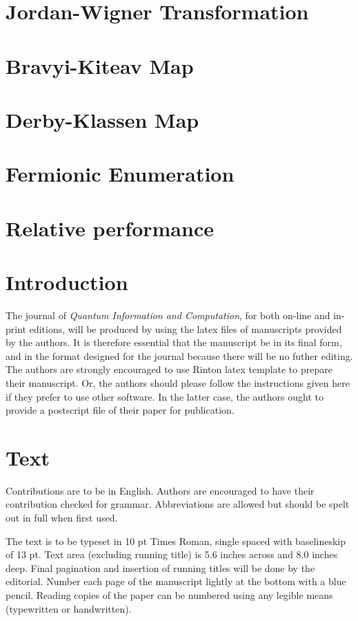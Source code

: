 \documentclass[twoside]{article}
\renewcommand{\thefootnote}{\fnsymbol{footnote}}  %
\begin{document}
\section{Jordan-Wigner Transformation}\label{jordan-wigner_section}
\section{Bravyi-Kiteav Map}\label{bravyi-kitaev_section}
\section{Derby-Klassen Map}\label{derby-klassen_section}
\section{Fermionic Enumeration}\label{fermionic-enumeration_section}
\section{Relative performance}\label{comparision_section}
\pagebreak
\section{Introduction}        
The journal of {\it Quantum Information and Computation},
for both on-line and in-print editions,
will be produced by using the latex files of manuscripts
provided by the authors. It is therefore essential that the manuscript 
be in its final form, and in the format designed for the journal 
because there will be no futher editing. The authors are strongly encouraged 
to use Rinton latex template to prepare their manuscript. Or, the authors 
should please follow the instructions given here if they prefer to use other 
software. In the latter case, the authors ought to
provide a postscript file of their paper for publication.

\section{Text}
\noindent
Contributions are to be in English. Authors are encouraged to
have their contribution checked for grammar.  
Abbreviations are allowed but should be spelt
out in full when first used. 

\setcounter{footnote}{0}
\renewcommand{\thefootnote}{\alph{footnote}}

The text is to be typeset in 10 pt Times Roman, single spaced
with baselineskip of 13 pt. Text area (excluding running title)
is 5.6 inches across and 8.0 inches deep.
Final pagination and insertion of running titles will be done by
the editorial. Number each page of the manuscript lightly at the
bottom with a blue pencil. Reading copies of the paper can be
numbered using any legible means (typewritten or handwritten).
\end{document}
